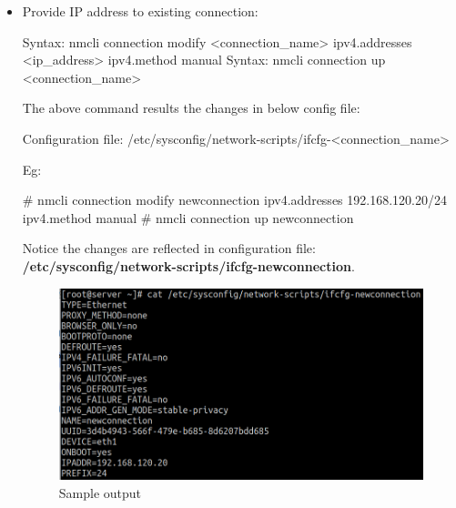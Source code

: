 \begin{flushleft}
\begin{itemize}
\begin{itemize}
		\bigskip
		\bigskip
		\item Provide IP address to existing connection:
		\begin{tcolorbox}[breakable,notitle,boxrule=-0pt,colback=pink,colframe=pink]
			\color{black}
			\font=9pt
			Syntax: nmcli connection modify <connection\_name> ipv4.addresses <ip\_address> ipv4.method manual
			\newline
			\newline
			Syntax: nmcli connection up <connection\_name>
			\font=4pt
		\end{tcolorbox}

		The above command results the changes in below config file:
		\begin{tcolorbox}[breakable,notitle,boxrule=-0pt,colback=pink,colframe=pink]
			\color{black}
			\font=9pt
			Configuration file:
			\newline
			/etc/sysconfig/network-scripts/ifcfg-<connection\_name>
			\font=4pt
		\end{tcolorbox}
		
		Eg:	
		\begin{tcolorbox}[breakable,notitle,boxrule=-0pt,colback=black,colframe=black]
			\font=9pt
			\color{green}
			\# nmcli connection modify newconnection ipv4.addresses 192.168.120.20/24 ipv4.method
			\color{green}
			 manual
			\newline
			\newline
			\color{green}
			\# nmcli connection up newconnection
			\font=4pt
		\end{tcolorbox}
		
		Notice the changes are reflected in configuration file: \textbf{/etc/sysconfig/network-scripts/ifcfg-newconnection}.
		\begin{figure}[h!]
			\centering
			\includegraphics[scale=.35]{content/chapter14/images/networkscript.png}
			\caption{Sample output}
			\label{fig:sample}
		\end{figure}		
	

\end{itemize}
\end{itemize}
\end{flushleft}
